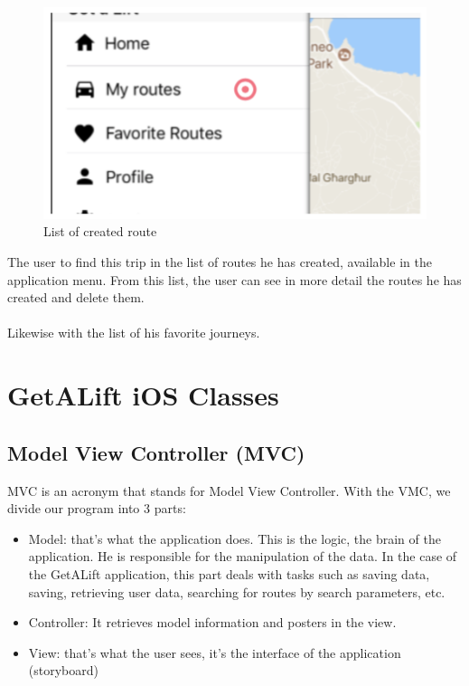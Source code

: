 \begin{figure}[h!]
\begin{center}
\includegraphics[scale = 0.3]{diagrams/ListCreatedRoute.png} 
\end{center}
\caption{List of created route}
\end{figure}

The user to find this trip in the list of routes he has created, available in the application menu. From this list, the user can see in more detail the routes he has created and delete them.
\\\\
Likewise with the list of his favorite journeys.

\section{GetALift iOS Classes}

\subsection{Model View Controller (MVC)}

MVC is an acronym that stands for Model View Controller. With the VMC, we divide our program into 3 parts:
\begin{itemize}
\item Model: that's what the application does. This is the logic, the brain of the application. He is responsible for the manipulation of the data. In the case of the GetALift application, this part deals with tasks such as saving data, saving, retrieving user data, searching for routes by search parameters, etc.
\item Controller: It retrieves model information and posters in the view.
\item View: that's what the user sees, it's the interface of the application (storyboard)
\end{itemize}

